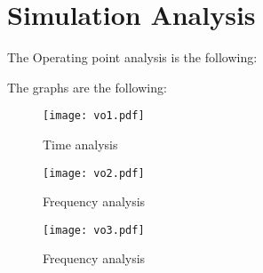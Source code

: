 \section{Simulation Analysis}
\label{sec:simulation}

The Operating point analysis is the following:


The graphs are the following:


\begin{figure}[H] \centering
  \texttt{[image: vo1.pdf]}
  \caption{Time analysis}
  \label{fig:acm}
  \end{figure}


  \begin{figure}[H] \centering
    \texttt{[image: vo2.pdf]}
    \caption{Frequency analysis}
    \label{fig:acm}
    \end{figure}


    \begin{figure}[H] \centering
      \texttt{[image: vo3.pdf]}
      \caption{Frequency analysis}
      \label{fig:acm}
      \end{figure}
